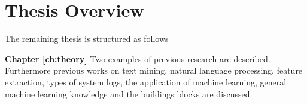 \section{Thesis Overview}
The remaining thesis is structured as follows\:

\setlength{\parindent}{3ex} \textbf{Chapter \ref{ch:theory}}\: Two examples of previous research are described. Furthermore previous works on text mining, natural language processing, feature extraction, types of system logs, the application of machine learning, general machine learning knowledge and the buildings blocks are discussed.




\begin{comment}
It is recommended to end the introduction with an overview of the thesis. This chapter contains the introduction; Chapter~\ref{ch:definitions} includes the definitions; Chapter~\ref{ch:relatedwork} discusses related work; Chapter~\ref{ch:evaluation} evaluates the contributions; Chapter~\ref{ch:conclusions} concludes.

Also make a nice sentence with ``bachelor thesis'', LIACS and the names of the supervisors.

\end{comment}